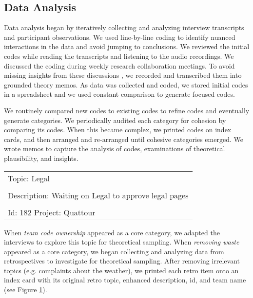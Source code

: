 \subsection{Data Analysis}
Data analysis began by iteratively collecting and analyzing interview transcripts and participant observations. We used line-by-line coding \cite{Charmaz} to identify nuanced interactions in the data and avoid jumping to conclusions. We reviewed the initial codes while reading the transcripts and listening to the audio recordings.  We discussed the coding during weekly research collaboration meetings. To avoid missing insights from these discussions \cite{GlaserTheoreticalSensitivity}, we recorded and transcribed them into grounded theory memos. As data was collected and coded, we stored initial codes in a spreadsheet and we used constant comparison to generate focused codes.


We routinely compared new codes to existing codes to refine codes and eventually generate categories. We periodically audited each category for cohesion by comparing its codes. When this became complex, we printed codes on index cards, and then arranged and re-arranged until cohesive categories emerged. We wrote memos to capture the analysis of codes, examinations of theoretical plausibility, and insights.


\begin{table}[t]
\renewcommand{\arraystretch}{1.5}
\centering
{}
\label{exampleRetroTopicl}
\begin{tabular}{|l|}
\hline
Topic: Legal \\ \\ Description: Waiting on Legal to approve legal pages \\ \\ Id: 182 Project: Quattour\\ \hline
\end{tabular}
\end{table}




When \textit{team code ownership} appeared as a core category, we adapted the interviews to explore this topic for theoretical sampling. When \textit{removing waste} appeared as a core category, we began collecting and analyzing data from retrospectives to investigate for theoretical sampling. After removing irrelevant topics (e.g. complaints about the weather), we printed each retro item onto an index card with its original retro topic, enhanced description, id, and team name (see Figure \ref{exampleRetroTopicl}).


